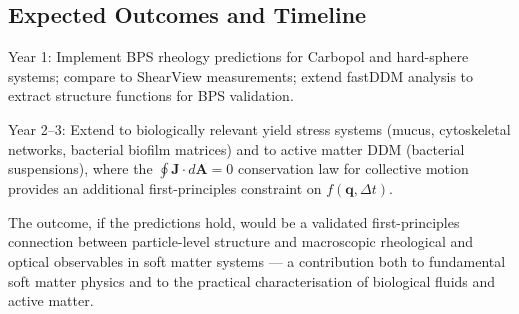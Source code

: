 \documentclass[12pt,a4paper]{article}
\begin{document}
\subsection*{Expected Outcomes and Timeline}

Year 1: Implement BPS rheology predictions for Carbopol and hard-sphere systems;
compare to ShearView measurements; extend fastDDM analysis to extract
structure functions for BPS validation.

Year 2--3: Extend to biologically relevant yield stress systems (mucus, cytoskeletal
networks, bacterial biofilm matrices) and to active matter DDM (bacterial suspensions),
where the $\oint \mathbf{J}\cdot d\mathbf{A} = 0$ conservation law for collective
motion provides an additional first-principles constraint on $f(\mathbf{q}, \Delta t)$.

The outcome, if the predictions hold, would be a validated first-principles
connection between particle-level structure and macroscopic rheological
and optical observables in soft matter systems --- a contribution both to
fundamental soft matter physics and to the practical characterisation of
biological fluids and active matter.
\end{document}
